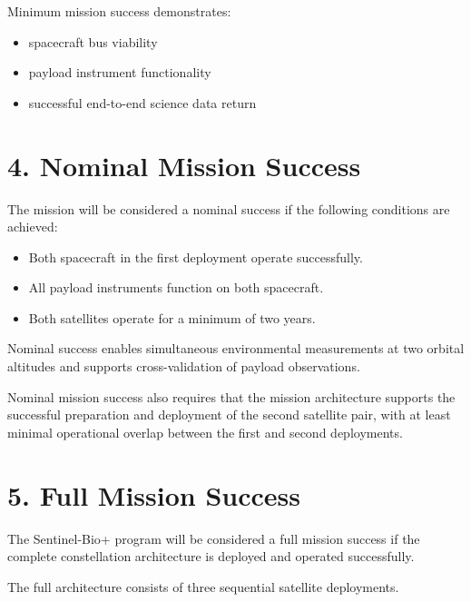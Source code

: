 \documentclass[11pt]{article}
\begin{document}
Minimum mission success demonstrates:

\begin{itemize}

\item spacecraft bus viability

\item payload instrument functionality

\item successful end-to-end science data return

\end{itemize}

\section*{4. Nominal Mission Success}

The mission will be considered a nominal success if the following conditions are achieved:

\begin{itemize}

\item Both spacecraft in the first deployment operate successfully.

\item All payload instruments function on both spacecraft.

\item Both satellites operate for a minimum of two years.

\end{itemize}

Nominal success enables simultaneous environmental measurements at two orbital altitudes and supports cross-validation of payload observations.

Nominal mission success also requires that the mission architecture supports the successful preparation and deployment of the second satellite pair, with at least minimal operational overlap between the first and second deployments.

\section*{5. Full Mission Success}

The Sentinel-Bio+ program will be considered a full mission success if the complete constellation architecture is deployed and operated successfully.

The full architecture consists of three sequential satellite deployments.
\end{document}
